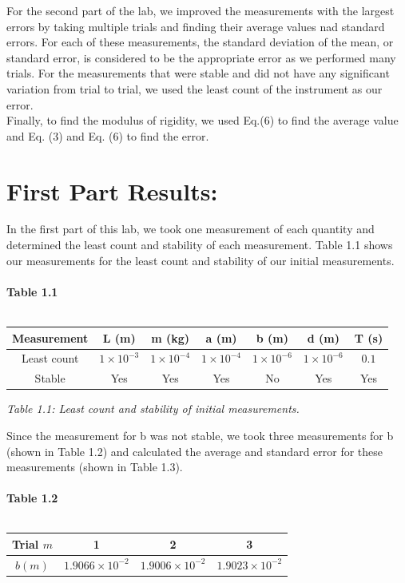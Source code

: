 \documentclass[leqno]{article}
\begin{document}
\noindent For the second part of the lab, we improved the measurements with the largest errors by taking multiple trials and finding their average values nad standard errors.  For each of these measurements, the standard deviation of the mean, or standard error, is considered to be the appropriate error as we performed many trials.  For the measurements that were stable and did not have any significant variation from trial to trial, we used the least count of the instrument as our error.\\

\noindent Finally, to find the modulus of rigidity, we used Eq.(6) to find the average value and Eq. (3) and Eq. (6) to find the error.  
\section*{First Part Results:}
In the first part of this lab, we took one measurement of each quantity and determined the least count and stability of each measurement.  Table 1.1 shows our measurements for the least count and stability of our initial measurements.\\\\
\textbf{Table 1.1}\\\\
\begin{tabular}{|c|c|c|c|c|c|c|}
	\hline
	Measurement & L (m)& m (kg)& a (m)& b (m)& d (m)& T (s)\\
	\hline
	Least count & $1 \times 10^{-3}$ & $1\times 10^{-4}$ & $1 \times 10^{-4}$ & $1 \times 10^{-6}$ & $1 \times 10^{-6}$ & $0.1$\\
	\hline
	Stable & Yes & Yes & Yes & No & Yes & Yes\\
	\hline
\end{tabular}
\begin{flushleft}
\textit{\small Table 1.1: Least count and stability of initial measurements.}
\end{flushleft}
Since the measurement for b was not stable, we took three measurements for b (shown in Table 1.2) and calculated the average and standard error for these measurements (shown in Table 1.3).\\\\
\textbf{Table 1.2}\\\\
\begin{tabular}{|c|c|c|c|}
	\hline
	Trial $m$ & 1 & 2 & 3\\
	\hline
	$b (m)$ & $1.9066 \times 10^{-2}$ & $1.9006 \times 10^{-2}$ & $1.9023 \times 10^{-2}$\\
	\hline
\end{tabular}
\end{document}
